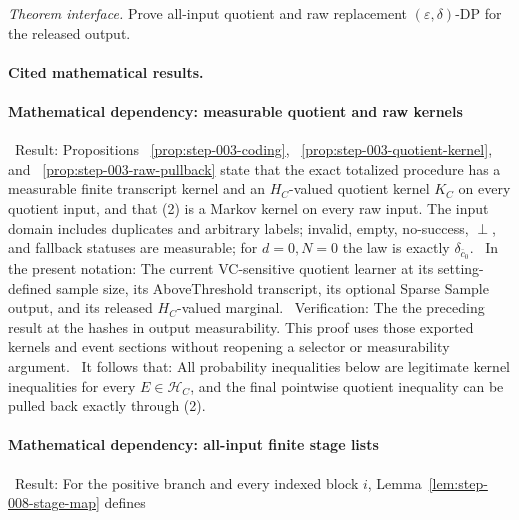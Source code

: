 \noindent\textit{Theorem interface.} Prove all-input quotient and raw replacement   \((\varepsilon,\delta)\)-DP for the released output.

\paragraph{Cited mathematical results.}


\paragraph{Mathematical dependency: measurable quotient and raw kernels}

\noindent\textbullet\ Result:  Propositions
  ~\ref{prop:step-003-coding},
  ~\ref{prop:step-003-quotient-kernel}, and
  ~\ref{prop:step-003-raw-pullback} state that the exact totalized procedure
  has a measurable finite transcript kernel and an \(H_C\)-valued quotient
  kernel \(K_C\) on every quotient input, and that (2) is a Markov kernel on
  every raw input. The input domain includes duplicates and arbitrary labels;
  invalid, empty, no-success, \(\perp\), and fallback statuses are measurable;
  for \(d=0,N=0\) the law is exactly \(\delta_{\bar c_0}\).
\noindent\textbullet\ In the present notation: The current VC-sensitive quotient learner at its
  setting-defined sample size, its AboveThreshold transcript, its optional
  Sparse Sample output, and its released \(H_C\)-valued marginal.
\noindent\textbullet\ Verification: The the preceding result at the hashes in
  output measurability. This proof uses those exported kernels and event
  sections without reopening a selector or measurability argument.
\noindent\textbullet\ It follows that: All probability inequalities below are legitimate kernel
  inequalities for every \(E\in\mathcal H_C\), and the final pointwise
  quotient inequality can be pulled back exactly through (2).

\paragraph{Mathematical dependency: all-input finite stage lists}

\noindent\textbullet\ Result: For the positive branch and every indexed block \(i\),
  Lemma~\ref{lem:step-008-stage-map} defines

